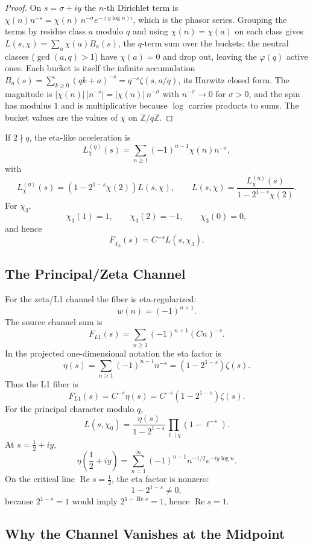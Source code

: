 \documentclass[11pt]{article}
\DeclareMathOperator{\Ree}{Re}
\begin{document}
\begin{proof}
On $s=\sigma+iy$ the $n$-th Dirichlet term is
$\chi(n)n^{-s}=\chi(n)\,n^{-\sigma}e^{-(y\log n)i}$, which is the phasor series.
Grouping the terms by residue class $a$ modulo $q$ and using $\chi(n)=\chi(a)$ on
each class gives $L(s,\chi)=\sum_{a}\chi(a)B_a(s)$, the $q$-term sum over the
buckets; the neutral classes ($\gcd(a,q)>1$) have $\chi(a)=0$ and drop out,
leaving the $\varphi(q)$ active ones.  Each bucket is itself the infinite
accumulation $B_a(s)=\sum_{k\ge0}(qk+a)^{-s}=q^{-s}\zeta(s,a/q)$, its Hurwitz
closed form.  The magnitude is
$|\chi(n)|\,|n^{-s}|=|\chi(n)|\,n^{-\sigma}$ with $n^{-\sigma}\to0$ for
$\sigma>0$, and the spin has modulus $1$ and is multiplicative because $\log$
carries products to sums.  The bucket values are the values of $\chi$ on
$\mathbb Z/q\mathbb Z$.
\end{proof}

If $2\nmid q$, the eta-like acceleration is
\[
  L_\chi^{(\eta)}(s)=\sum_{n\ge1}(-1)^{n-1}\chi(n)n^{-s},
\]
with
\[
  L_\chi^{(\eta)}(s)=(1-2^{1-s}\chi(2))L(s,\chi),
  \qquad
  L(s,\chi)=\frac{L_\chi^{(\eta)}(s)}{1-2^{1-s}\chi(2)}.
\]
For $\chi_3$,
\[
  \chi_3(1)=1,\qquad \chi_3(2)=-1,\qquad \chi_3(0)=0,
\]
and hence
\[
  F_{\chi_3}(s)
  =
  C^{-s}L(s,\chi_3).
\]

\subsection{The Principal/Zeta Channel}

For the zeta/L1 channel the fiber is eta-regularized:
\[
  w(n)=(-1)^{n+1}.
\]
The source channel sum is
\[
  F_{L1}(s)=\sum_{n\ge1}(-1)^{n+1}(Cn)^{-s}.
\]
In the projected one-dimensional notation the eta factor is
\[
  \eta(s)
  =
  \sum_{n\ge1}(-1)^{n-1}n^{-s}
  =
  (1-2^{1-s})\zeta(s).
\]
Thus the L1 fiber is
\[
  F_{L1}(s)
  =
  C^{-s}\eta(s)
  =
  C^{-s}(1-2^{1-s})\zeta(s).
\]
For the principal character modulo $q$,
\[
  L(s,\chi_0)=
  \frac{\eta(s)}{1-2^{1-s}}\prod_{\ell\mid q}(1-\ell^{-s}).
\]
At $s=\frac12+iy$,
\[
  \eta\!\left(\frac12+iy\right)
  =
  \sum_{n=1}^{\infty}(-1)^{n-1}n^{-1/2}e^{-iy\log n}.
\]
On the critical line $\Ree s=\frac12$, the eta factor is nonzero:
\[
  1-2^{1-s}\ne0,
\]
because $2^{1-s}=1$ would imply $2^{1-\Ree s}=1$, hence $\Ree s=1$.

\subsection{Why the Channel Vanishes at the Midpoint}
\end{document}
